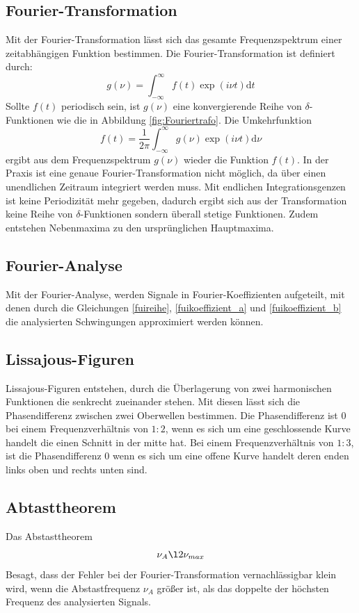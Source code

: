 \subsection{Fourier-Transformation}
\label{sec:Fourier-Transformation}
Mit der Fourier-Transformation lässt sich das gesamte Frequenzspektrum einer
zeitabhängigen Funktion bestimmen. Die Fourier-Transformation ist definiert durch:
\begin{equation}
  g(\nu)= \int_{-\infty}^\infty f(t)\exp(i\nu t) \mathrm{d}t
\end{equation}
Sollte $f(t)$ periodisch sein, ist $g(\nu)$ eine konvergierende Reihe von
$\delta$-Funktionen wie die in Abbildung \ref{fig:Fouriertrafo}. Die Umkehrfunktion
\begin{equation}
  f(t)= \frac{1}{2\pi}\int_{-\infty}^\infty g(\nu)\exp(i\nu t) \mathrm{d}\nu
\end{equation}
ergibt aus dem Frequenzspektrum $g(\nu)$ wieder die Funktion $f(t)$. In der
Praxis ist eine genaue Fourier-Transformation nicht möglich, da über einen unendlichen
Zeitraum integriert werden muss. Mit endlichen Integrationsgenzen ist keine
Periodizität mehr gegeben, dadurch ergibt sich aus der Transformation keine Reihe
von $\delta$-Funktionen sondern überall stetige Funktionen. Zudem entstehen
Nebenmaxima zu den ursprünglichen Hauptmaxima.
\subsection{Fourier-Analyse}
\label{sec:Fourier-Analyse}
Mit der Fourier-Analyse, werden Signale in Fourier-Koeffizienten aufgeteilt, mit
denen durch die Gleichungen \eqref{fuireihe}, \eqref{fuikoeffizient_a}
und \eqref{fuikoeffizient_b} die analysierten Schwingungen approximiert werden können.
\subsection{Lissajous-Figuren}
Lissajous-Figuren entstehen, durch die Überlagerung von zwei harmonischen
Funktionen die senkrecht zueinander stehen. Mit diesen lässt sich die Phasendifferenz
zwischen zwei Oberwellen bestimmen.
Die Phasendifferenz ist $0$ bei einem Frequenzverhältnis von $1:2$, wenn es sich um
eine geschlossende Kurve handelt die einen Schnitt in der mitte hat.
Bei einem Frequenzverhältnis von $1:3$, ist die Phasendifferenz $0$ wenn es sich
um eine offene Kurve handelt deren enden links oben und rechts unten sind.
\subsection{Abtasttheorem}
Das Abstasttheorem
\begin{equation}
  \nu_A\l2\nu_{max}
\end{equation}
Besagt, dass der Fehler bei der Fourier-Transformation vernachlässigbar klein wird,
wenn die Abstastfrequenz $\nu_A$ größer ist, als das doppelte der höchsten Frequenz
des analysierten Signals.
\cite{sample}
